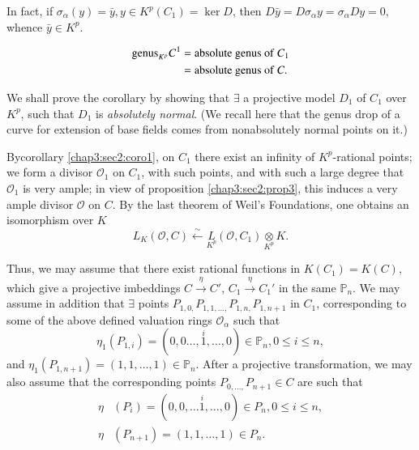 In fact, if $ \sigma_\alpha  (y)=\bar{y}, y \in K^p (C_1) =\ker D$,
then $D\bar{y}=D \sigma_\alpha  y =\sigma_\alpha  Dy=0, $ whence
$\bar{y} \in K^p$. 

\begin{corollary}\label{chap3:sec2:coro2}%
  \begin{align*}
    {\rm genus}_{{K}^p} C^1 & =  {\rm absolute ~ genus ~of}~  C_1\\ 
    & =  {\rm absolute ~genus ~of}~ C.
  \end{align*}
\end{corollary}

We shall prove the corollary by showing that $\exists$   a projective
model $D_1$ of $C_1$ over  $ K^p$, such that $D_1$ is
\textit{absolutely normal}. (We recall here that the genus drop of a
curve for extension of base  fields comes from nonabsolutely normal
points on it.) 

By\pageoriginale corollary \ref{chap3:sec2:coro1}, on $C_1$ there exist an infinity of $K^p$-rational
points; we form a divisor $\mathcal{O}_1$ on $C_1$, with such points,
and with such a large degree that $\mathcal{O}_1$ is very ample; in
view of proposition \ref{chap3:sec2:prop3}, this induces a very ample divisor
$\mathcal{O}$ on $C$. By the last theorem of Weil's Foundations, one
obtains an isomorphism over $K$   
$$ 
L_K(\mathcal{O},C)\overset{\sim}{\leftarrow} \underset{K^p} L
(\mathcal{O},C_1)\underset{K^p}\otimes K. 
$$
   
Thus, we may assume that there exist rational functions in $
K(C_1)=K(C)$, which give a projective imbeddings   $C
\overset{\eta}{\longrightarrow} C'$, $C_1\overset{\eta
}{\longrightarrow}C_1'$  in the same $\mathbb{P}_n$. We may assume in
addition that $\exists$ points $P_{1,0,}P_{1,1,\ldots,} P_{1,n,}
P_{1,n+1}$ in $C_1$, corresponding to some of the above defined
valuation rings $\mathcal{O}_\alpha $ such that 
$$ 
\eta_1(P_{1,i})=(0,0\ldots , \overset{i}{1},\ldots, 0)\in
\mathbb{P}_n, 0\leq i \leq n, 
$$
and $\eta_1(P_{1,n+1})=(1,1,\ldots, 1) \in \mathbb{P}_n$. After a projective transformation, we may also assume that the corresponding points $ P_{0,\ldots, }P_{n+1} \in C$ are such that 
\begin{align*}
  \eta & (P_i)  = (0,0,\ldots \overset{i}{1},\ldots, 0) \in
       {P}_n,0\leq i \leq n,\\ 
       \eta & (P_{n+1})  = (1,1,\ldots, 1)\in {P}_n.
\end{align*}

